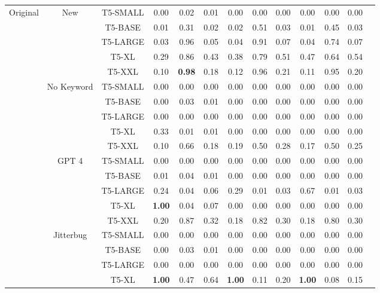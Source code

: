 \documentclass[twocolumn]{article}
\begin{document}
\begin{table}[ht!]
{\begin{tabular}{|c|c|c|ccc|ccc|ccc|c|}
\multirow{25}{*}{\centering Original}&\multirow{5}{*}{\centering New} & T5-SMALL  & 0.00 & 0.02 & 0.01  & 0.00 & 0.00 & 0.00  & 0.00 & 0.00 & 0.00 &   \multirow{25}{*}{\centering 137} \\
& & T5-BASE  & 0.01 & 0.31 & 0.02  & 0.02 & 0.51 & 0.03  & 0.01 & 0.45 & 0.03  & \\
& & T5-LARGE  & 0.03 & 0.96 & 0.05  & 0.04 & 0.91 & 0.07  & 0.04 & 0.74 & 0.07  & \\
& & T5-XL  & 0.29 & 0.86 & 0.43  & 0.38 & 0.79 & 0.51  & 0.47 & 0.64 & 0.54  & \\
& & T5-XXL  & 0.10 & \textbf{0.98} & 0.18  & 0.12 & 0.96 & 0.21  & 0.11 & 0.95 & 0.20  & \\
\cline{2-12}
&\multirow{5}{*}{\centering No Keyword} & T5-SMALL  & 0.00 & 0.00 & 0.00  & 0.00 & 0.00 & 0.00  & 0.00 & 0.00 & 0.00  & \\
& & T5-BASE  & 0.00 & 0.03 & 0.01  & 0.00 & 0.00 & 0.00  & 0.00 & 0.00 & 0.00  & \\
& & T5-LARGE  & 0.00 & 0.00 & 0.00  & 0.00 & 0.00 & 0.00  & 0.00 & 0.00 & 0.00  & \\
& & T5-XL  & 0.33 & 0.01 & 0.01  & 0.00 & 0.00 & 0.00  & 0.00 & 0.00 & 0.00  & \\
& & T5-XXL  & 0.10 & 0.66 & 0.18  & 0.19 & 0.50 & 0.28  & 0.17 & 0.50 & 0.25  & \\
\cline{2-12}
&\multirow{5}{*}{\centering GPT 4} & T5-SMALL  & 0.00 & 0.00 & 0.00  & 0.00 & 0.00 & 0.00  & 0.00 & 0.00 & 0.00  & \\
& & T5-BASE  & 0.01 & 0.04 & 0.01  & 0.00 & 0.00 & 0.00  & 0.00 & 0.00 & 0.00  & \\
& & T5-LARGE  & 0.24 & 0.04 & 0.06  & 0.29 & 0.01 & 0.03  & 0.67 & 0.01 & 0.03  & \\
& & T5-XL  & \textbf{1.00} & 0.04 & 0.07  & 0.00 & 0.00 & 0.00  & 0.00 & 0.00 & 0.00  & \\
& & T5-XXL  & 0.20 & 0.87 & 0.32  & 0.18 & 0.82 & 0.30  & 0.18 & 0.80 & 0.30  & \\
\cline{2-12}
&\multirow{5}{*}{\centering Jitterbug} & T5-SMALL  & 0.00 & 0.00 & 0.00  & 0.00 & 0.00 & 0.00  & 0.00 & 0.00 & 0.00  & \\
& & T5-BASE  & 0.00 & 0.03 & 0.01  & 0.00 & 0.00 & 0.00  & 0.00 & 0.00 & 0.00  & \\
& & T5-LARGE  & 0.00 & 0.00 & 0.00  & 0.00 & 0.00 & 0.00  & 0.00 & 0.00 & 0.00  & \\
& & T5-XL  & \textbf{1.00} & 0.47 & 0.64  & \textbf{1.00} & 0.11 & 0.20  & \textbf{1.00} & 0.08 & 0.15  & \\

\end{tabular}}
\end{table}
\end{document}
